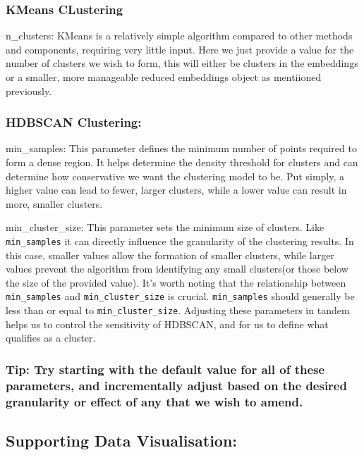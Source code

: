 \documentclass[
  letterpaper,
  DIV=11,
  numbers=noendperiod]{scrreprt}
\begin{document}
\subsubsection{KMeans CLustering}\label{kmeans-clustering}

n\_clusters: KMeans is a relatively simple algorithm compared to other
methods and components, requiring very little input. Here we just
provide a value for the number of clusters we wish to form, this will
either be clusters in the embeddings or a smaller, more manageable
reduced embeddings object as mentiioned previously.

\subsubsection{HDBSCAN Clustering:}\label{hdbscan-clustering}

min\_samples: This parameter defines the minimum number of points
required to form a dense region. It helps determine the density
threshold for clusters and can determine how conservative we want the
clustering model to be. Put simply, a higher value can lead to fewer,
larger clusters, while a lower value can result in more, smaller
clusters.

min\_cluster\_size: This parameter sets the minimum size of clusters.
Like \texttt{min\_samples} it can directly influence the granularity of
the clustering results. In this case, smaller values allow the formation
of smaller clusters, while larger values prevent the algorithm from
identifying any small clusters(or those below the size of the provided
value). It's worth noting that the relationship between
\texttt{min\_samples} and \texttt{min\_cluster\_size} is crucial.
\texttt{min\_samples} should generally be less than or equal to
\texttt{min\_cluster\_size}. Adjusting these parameters in tandem helps
us to control the sensitivity of HDBSCAN, and for us to define what
qualifies as a cluster.

\subsubsection{Tip: Try starting with the default value for all of these
parameters, and incrementally adjust based on the desired granularity or
effect of any that we wish to
amend.}\label{tip-try-starting-with-the-default-value-for-all-of-these-parameters-and-incrementally-adjust-based-on-the-desired-granularity-or-effect-of-any-that-we-wish-to-amend.}

\subsection{Supporting Data
Visualisation:}\label{supporting-data-visualisation}
\end{document}
